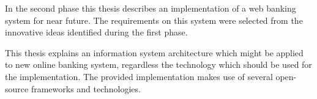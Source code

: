 \documentclass[11pt,twoside,a4paper]{book}
\begin{document}
In the second phase this thesis describes an implementation of a web banking system for near future. The requirements on this system were selected from the innovative ideas identified during the first phase.

This thesis explains an information system architecture which might be applied to new online banking system, regardless the technology which should be used for the implementation. The provided implementation makes use of several open-source frameworks and technologies. 









%


%

%
{

}

\appendix



\end{document}
